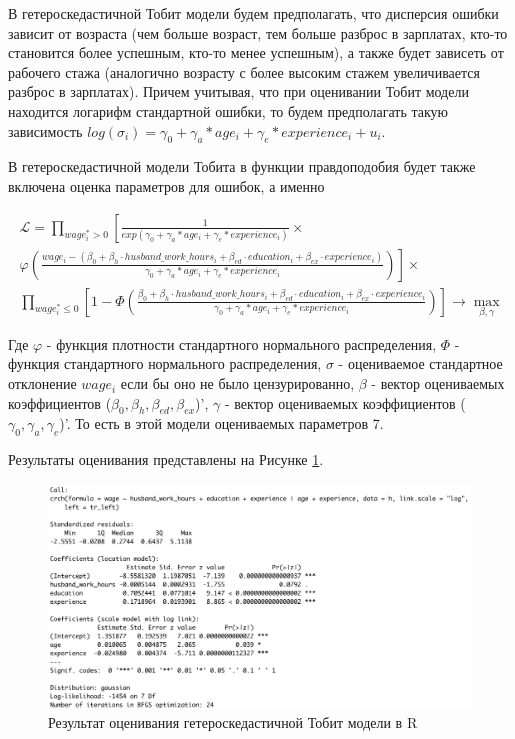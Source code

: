\documentclass[a4paper,12pt]{article}
\begin{document}
\vspace{0.2cm}

В гетероскедастичной Тобит модели будем предполагать, что дисперсия ошибки зависит от возраста (чем больше возраст, тем больше разброс в зарплатах, кто-то становится более успешным, кто-то менее успешным), а также будет зависеть от рабочего стажа (аналогично возрасту с более высоким стажем увеличивается разброс в зарплатах). Причем учитывая, что при оценивании Тобит модели находится логарифм стандартной ошибки, то будем предполагать такую зависимость $log(\sigma_i) = \gamma_0+\gamma_a*age_i+\gamma_e*experience_i+u_i$. 

В гетероскедастичной модели Тобита в функции правдоподобия будет также включена оценка параметров для ошибок, а именно 

\begin{equation*}\
	\begin{aligned}
		\mathcal{L} = \prod_{wage_i^* > 0} \left[\frac{1}{exp(\gamma_0+\gamma_a*age_i+\gamma_e*experience_i)}\times \right. \\ \left. \varphi\left(\frac{wage_i-(\beta_0 + \beta_h \cdot husband\_work\_hours_i +\beta_{ed} \cdot education_i + \beta_{ex} \cdot experience_i )}{\gamma_0+\gamma_a*age_i+\gamma_e*experience_i}\right) \right] \times \\ 
		\prod_{wage_i^* \leq 0} \left[1-\Phi\left(  \frac{\beta_0 + \beta_h \cdot husband\_work\_hours_i +\beta_{ed} \cdot education_i + \beta_{ex} \cdot experience_i }{\gamma_0+\gamma_a*age_i+\gamma_e*experience_i}  \right)    \right] \rightarrow \max_{\beta, \gamma}
	\end{aligned}
\end{equation*}

Где $\varphi$ - функция плотности стандартного нормального распределения, $\Phi$ - функция стандартного нормального распределения, $\sigma$ - оцениваемое стандартное отклонение  $wage_i$ если бы оно не было цензурированно, $\beta$ - вектор оцениваемых коэффициентов ($\beta_0, \beta_h, \beta_{ed}, \beta_{ex}$)', $\gamma$ - вектор оцениваемых коэффициентов ($\gamma_0, \gamma_a, \gamma_e$)'. То есть в этой модели оцениваемых параметров 7. 

Результаты оценивания представлены на Рисунке \ref{tobit3}.

\begin{figure}[!h] \centering
	\caption{Результат оценивания гетероскедастичной Тобит модели в R }
	\label{tobit3}
	\includegraphics[scale=0.6]{tobit3.png}
\end{figure}
\end{document}
